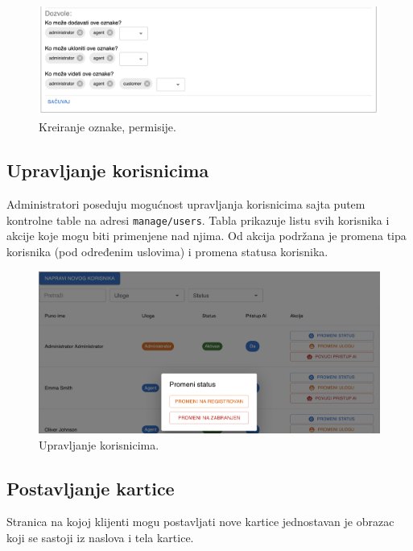 \documentclass[12pt,oneside]{memoir}
\begin{document}
\begin{figure}[h]
  \centering
  \includegraphics[width=1\textwidth]{docs/images/ch_1/tag-mgmt-permissions.png} 
  \caption{Kreiranje oznake, permisije.}
  \label{fig:tags_admin_2}
\end{figure}

\newpage
\subsection{Upravljanje korisnicima}

Administratori poseduju mogućnost upravljanja korisnicima sajta putem kontrolne table na adresi \verb|manage/users|. Tabla prikazuje listu svih korisnika i akcije koje mogu biti primenjene nad njima. Od akcija podržana je promena tipa korisnika (pod određenim uslovima) i promena statusa korisnika.

\begin{figure}[h]
  \centering
  \includegraphics[width=1\textwidth]{docs/images/ch_1/manage-users-preview.png} 
  \caption{Upravljanje korisnicima.}
\end{figure}

\newpage
\subsection{Postavljanje kartice}

Stranica na kojoj klijenti mogu postavljati nove kartice jednostavan je obrazac koji se sastoji iz naslova i tela kartice.
\end{document}
